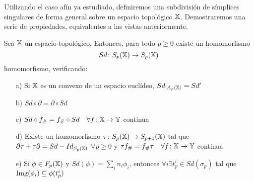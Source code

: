 
Utilizando el caso afín ya estudiado, definiremos una subdivisión de símplices singulares de forma general sobre
un espacio topológico ${\mathbb X}$. Demostraremos una serie de propiedades, equivalentes a las vistas anteriormente.

\begin{proposition}
  Sea ${\mathbb X}$ un espacio topológico. Entonces, para todo $p \geq 0$ existe un homomorfismo
  \[Sd\colon S_p{({\mathbb X})} \to S_p{({\mathbb X})} \] homomorfismo, verificando:
  \begin{itemize}
    \item[a)] Si ${\mathbb X}$ es un convexo de un espacio euclídeo, $Sd_{|A_p({\mathbb X})} = Sd'$
    \item[b)] $Sd \circ \partial = \partial \circ Sd$
    \item[c)] $Sd \circ f_\# = f_\# \circ Sd \quad \forall f \colon {\mathbb X} \to {\mathbb Y}$ continua
    \item[d)] Existe un homomorfismo $\tau \colon S_{p}({\mathbb X}) \to S_{p+1}({\mathbb X})$ tal que ${\partial \tau + \tau \partial = Sd - Id_{S_p({\mathbb X})}}$
              $\forall p \geq 0$ y $\tau f_\# = f_\# \tau \quad \forall f \colon {\mathbb X} \to {\mathbb Y}$ continua
    \item[e)] Si $\phi \in F_p({\mathbb X})$ y $Sd(\phi) = \sum_i n_i \phi_i$, entonces $\forall i \exists t_p^i \in Sd(\sigma_p)$ tal que
              $\operatorname{Img}(\phi_i) \subseteq \phi(t_p^i)$

  \end{itemize}
\end{proposition}

